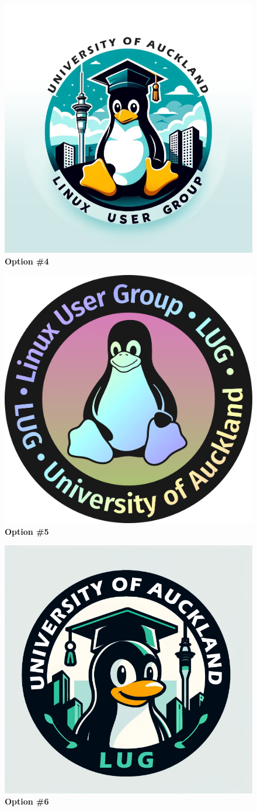 \documentclass[11pt,fleqn]{article}
\begin{document}
\begin{figure}
  \centering
  \includegraphics[width=0.56\linewidth]{res/4.png}
  \caption*{\Large{\textbf{Option \#4}}}
\end{figure}

\begin{figure}
  \centering
  \includegraphics[width=0.56\linewidth]{res/5-lug-logo-circlified-safe-text.png}
  \caption*{\Large{\textbf{Option \#5}}}
\end{figure}

\begin{figure}
  \centering
  \includegraphics[width=0.56\linewidth]{res/6.png}
  \caption*{\Large{\textbf{Option \#6}}}
\end{figure}
\end{document}

